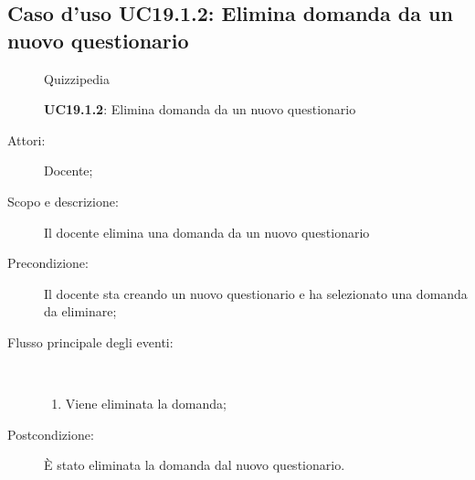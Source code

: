 \subsection{Caso d'uso UC19.1.2: Elimina domanda da un nuovo questionario}
	\begin{figure}[H]
		\centering
		\begin{resizedtikzpicture}{\textwidth}
		\begin{umlsystem}[x=0, fill=lightgray!20]{Quizzipedia}
		\end{umlsystem}
		\end{resizedtikzpicture}
		\caption{\textbf{UC19.1.2}: Elimina domanda da un nuovo questionario}
		\label{UC19.1.2}
	\end{figure}
\begin{description}
\item[Attori:] Docente;
\item[Scopo e descrizione:] Il docente elimina una domanda da un nuovo questionario
      \item[Precondizione:] Il docente sta creando un nuovo questionario e ha selezionato una domanda da eliminare;

        \item[Flusso principale degli eventi:] \ 
 \begin{enumerate}
          \item Viene eliminata la domanda;

      \end{enumerate}
    \item[Postcondizione:] È stato eliminata la domanda dal nuovo questionario.
  \end{description}
\hypertarget{UC19.1.3}{}
